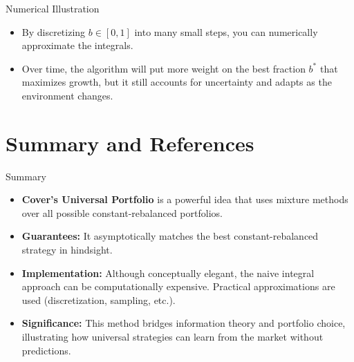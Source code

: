 \documentclass{beamer}
\begin{document}
\begin{small}
\begin{frame}{Numerical Illustration}
  \begin{itemize}
    \item By discretizing \(b \in [0,1]\) into many small steps, you can numerically approximate the integrals.
    \item Over time, the algorithm will put more weight on the best fraction \(b^*\) that maximizes growth, 
          but it still accounts for uncertainty and adapts as the environment changes.
  \end{itemize}
\end{frame}

\section{Summary and References}
\begin{frame}{Summary}
  \begin{itemize}
    \item \textbf{Cover's Universal Portfolio} is a powerful idea that uses mixture methods over all possible 
          constant-rebalanced portfolios.
    \item \textbf{Guarantees:} It asymptotically matches the best constant-rebalanced strategy in hindsight.
    \item \textbf{Implementation:} Although conceptually elegant, the naive integral approach can be computationally 
          expensive. Practical approximations are used (discretization, sampling, etc.).
    \item \textbf{Significance:} This method bridges information theory and portfolio choice, 
          illustrating how universal strategies can learn from the market without predictions.
  \end{itemize}
\end{frame}
\fi

\end{small}
\end{document}
